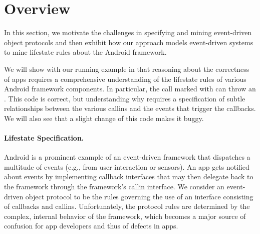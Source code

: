 \documentclass[10pt,reprint,nocopyrightspace,numbers]{sigplanconf}
\begin{document}
\section{Overview}
\label{sec:overview}

In this section, we motivate the challenges in specifying and mining
event-driven object protocols and then exhibit how our approach models
event-driven systems to mine lifestate rules about the Android framework.

We will show with our running example in  that reasoning about the correctness of apps requires a comprehensive understanding of the lifestate rules of various Android framework components.
In particular, the call marked with \danger{} can throw an .
This code is correct, but understanding why requires a specification of subtle relationships between the various callins and the events that trigger the callbacks.
We will also see that a slight change of this code makes it buggy.

\paragraph{Lifestate Specification.}
%
Android is a prominent example of an event-driven framework that dispatches a multitude of events (e.g., from user interaction or sensors).
An app gets notified about events by implementing callback interfaces that may then delegate back to the framework through the framework's callin interface. We consider an event-driven object protocol to be the rules governing the use of an interface consisting of callbacks and callins.
Unfortunately, the protocol rules are determined by the complex, internal behavior of the framework, which becomes a major source of confusion for app developers and thus of defects in apps.
\end{document}

